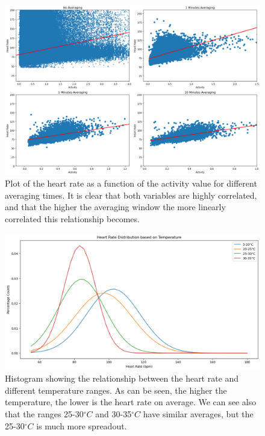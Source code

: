 \documentclass[../main.tex]{subfiles}
\begin{document}
        \begin{figure}[h]
            \begin{center}
            \centering
            \includegraphics[width={\columnwidth}]{images/activity_hr_correlation.png}
            \caption{Plot of the heart rate as a function of the activity value for different averaging times. It is clear that both variables are highly correlated, and that the higher the averaging window the more linearly correlated this relationship becomes.}
            \label{fig:corr}
            \end{center}
        \end{figure}

        \begin{figure}[h]
            \begin{center}
            \centering
            \includegraphics[width={\columnwidth}]{images/temperature.png}
            \caption{Histogram showing the relationship between the heart rate and different temperature ranges. As can be seen, the higher the temperature, the lower is the heart rate on average. We can see also that the ranges 25-30$^\circ C$ and 30-35$^\circ C$ have similar averages, but the 25-30$^\circ C$ is much more spreadout.}
            \label{fig:temp}
            \end{center}
        \end{figure}

        
\end{document}
